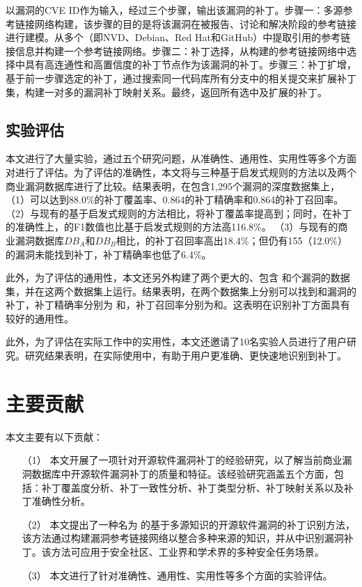 \tool 以漏洞的CVE ID作为输入，经过三个步骤，输出该漏洞的补丁。步骤一：多源参考链接网络构建，该步骤的目的是将该漏洞在被报告、讨论和解决阶段的参考链接进行建模。\tool 从多个（即NVD、Debian、Red Hat和GitHub）中提取引用的参考链接信息并构建一个参考链接网络。步骤二：补丁选择，\tool 从构建的参考链接网络中选择中具有高连通性和高置信度的补丁节点作为该漏洞的补丁。步骤三：补丁扩增，基于前一步骤选定的补丁，\tool 通过搜索同一代码库所有分支中的相关提交来扩展补丁集，构建一对多的漏洞补丁映射关系。最终，返回所有选中及扩展的补丁。

\subsection{实验评估}
本文进行了大量实验，通过五个研究问题，从准确性、通用性、实用性等多个方面对\tool 进行了评估。为了评估\tool 的准确性，本文将\tool 与三种基于启发式规则的方法以及两个商业漏洞数据库进行了比较。结果表明，在包含1,295个漏洞的深度数据集上，
（1）\tool 可以达到88.0\%的补丁覆盖率、0.864的补丁精确率和0.864的补丁召回率。
（2）与现有的基于启发式规则的方法相比，\tool 将补丁覆盖率提高到；同时，在补丁的准确性上，\tool 的F1数值也比基于启发式规则的方法高116.8\%。
（3）与现有的商业漏洞数据库$DB_A$和$DB_B$相比，\tool 的补丁召回率高出18.4\%；但仍有155（12.0\%）的漏洞\tool 未能找到补丁，补丁精确率也低了6.4\%。%

此外，为了评估\tool 的通用性，本文还另外构建了两个更大的、包含 和个漏洞的数据集，并在这两个数据集上运行\tool 。结果表明，\tool 在两个数据集上分别可以找到和漏洞的补丁，补丁精确率分别为 和，补丁召回率分别为和。这表明\tool 在识别补丁方面具有较好的通用性。

此外，为了评估\tool 在实际工作中的实用性，本文还邀请了10名实验人员进行了用户研究。研究结果表明，在实际使用中，\tool 有助于用户更准确、更快速地识别到补丁。

\section{主要贡献}
本文主要有以下贡献：
\begin{enumerate}
\item [（1）]本文开展了一项针对开源软件漏洞补丁的经验研究，以了解当前商业漏洞数据库中开源软件漏洞补丁的质量和特征。该经验研究涵盖五个方面，包括：补丁覆盖度分析、补丁一致性分析、补丁类型分析、补丁映射关系以及补丁准确性分析。
\item [（2）]本文提出了一种名为 \tool 的基于多源知识的开源软件漏洞的补丁识别方法，该方法通过构建漏洞参考链接网络以整合多种来源的知识，并从中识别漏洞补丁。该方法可应用于安全社区、工业界和学术界的多种安全任务场景。
\item [（3）]本文进行了针对\tool 准确性、通用性、实用性等多个方面的实验评估。
\end{enumerate}


